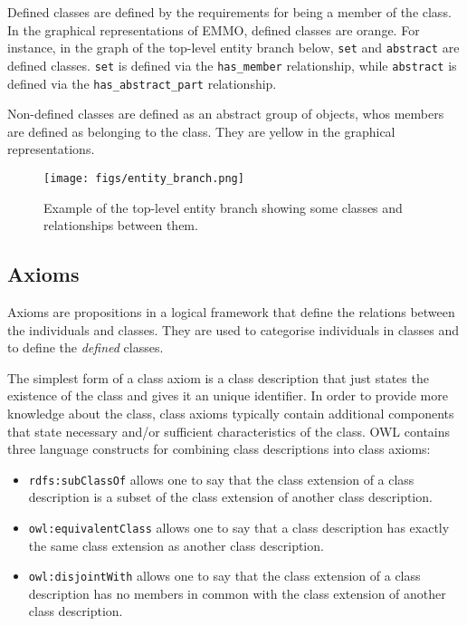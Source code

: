 \documentclass[a4paper,]{report}
\begin{document}
Defined classes are defined by the requirements for being a member of
the class. In the graphical representations of EMMO, defined classes are
orange. For instance, in the graph of the top-level entity branch below,
\texttt{set} and \texttt{abstract} are defined classes. \texttt{set} is
defined via the \texttt{has\_member} relationship, while
\texttt{abstract} is defined via the \texttt{has\_abstract\_part}
relationship.

Non-defined classes are defined as an abstract group of objects, whos
members are defined as belonging to the class. They are yellow in the
graphical representations.

\begin{figure}
\centering
\texttt{[image: figs/entity\_branch.png]}
\caption{Example of the top-level entity branch showing some classes and
relationships between them.}
\end{figure}

\hypertarget{axioms}{%
\subsection{Axioms}\label{axioms}}

Axioms are propositions in a logical framework that define the relations
between the individuals and classes. They are used to categorise
individuals in classes and to define the \emph{defined} classes.

The simplest form of a class axiom is a class description that just
states the existence of the class and gives it an unique identifier. In
order to provide more knowledge about the class, class axioms typically
contain additional components that state necessary and/or sufficient
characteristics of the class. OWL contains three language constructs for
combining class descriptions into class axioms:

\begin{itemize}
\item
  \texttt{rdfs:subClassOf} allows one to say that the class extension of
  a class description is a subset of the class extension of another
  class description.
\item
  \texttt{owl:equivalentClass} allows one to say that a class
  description has exactly the same class extension as another class
  description.
\item
  \texttt{owl:disjointWith} allows one to say that the class extension
  of a class description has no members in common with the class
  extension of another class description.
\end{itemize}
\end{document}
